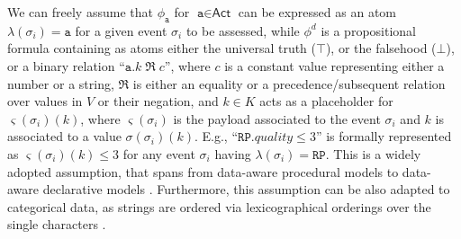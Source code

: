 We can freely assume that %
$\phi_\texttt{a}$ for $\texttt{a}\in\textsf{Act}$ can be expressed as an atom $\lambda(\sigma_i)=\texttt{a}$ for a given event $\sigma_i$ to be assessed, while $\phi^d$ is a propositional formula containing as atoms either
the universal truth ($\top$), or the falsehood ($\bot$), or a %
binary relation ``$\texttt{a}.k\;\Re\;c$'', where $c$ is a constant value 
%
%
%
representing either a number or a string, $\Re$ is either an equality or a precedence/subsequent relation over values in $V$ or their negation, and $k\in K$ acts as a placeholder for $\varsigma(\sigma_i)(k)$, where $\varsigma(\sigma_i)$ is the payload associated to the event $\sigma_i$ and $k$ is associated to a value $\sigma(\sigma_i)(k)$. E.g., ``$\texttt{RP}.\textit{quality}\leq 3$'' is formally represented as $\varsigma(\sigma_i)(k)\leq 3$ for any event $\sigma_i$ having $\lambda(\sigma_i)=\texttt{RP}$.  This is a widely adopted assumption, that spans from data-aware procedural models \cite{MultiPerspective} to data-aware declarative models \cite{10.1007/978-3-642-40176-3_8}. Furthermore, this assumption can be also adapted to categorical data, as strings are ordered via lexicographical orderings over the single characters \cite{MultiPerspective}.

